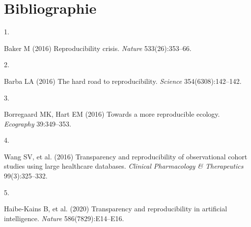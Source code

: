 \documentclass[9pt,twocolumn,twoside,]{pnas-new}
\newlength{\cslhangindent}
\newlength{\csllabelwidth}
\newlength{\cslentryspacingunit} %
\newenvironment{CSLReferences}[2] %
 {%
  \setlength{\parindent}{0pt}
  \ifodd #1
  \let\oldpar\par
  \def\par{\hangindent=\cslhangindent\oldpar}
  \fi
  \setlength{\parskip}{#2\cslentryspacingunit}
 }%
 {}
\newcommand{\CSLLeftMargin}[1]{\parbox[t]{\csllabelwidth}{#1}}
\newcommand{\CSLRightInline}[1]{\parbox[t]{\linewidth - \csllabelwidth}{#1}\break}
\begin{document}
\newpage

\hypertarget{bibliographie}{%
\section*{Bibliographie}\label{bibliographie}}

\hypertarget{refs}{}
\begin{CSLReferences}{0}{0}
\leavevmode{}%
\CSLLeftMargin{1. }
\CSLRightInline{Baker M (2016) Reproducibility crisis. \emph{Nature}
533(26):353--66.}

\leavevmode{}%
\CSLLeftMargin{2. }
\CSLRightInline{Barba LA (2016) The hard road to reproducibility.
\emph{Science} 354(6308):142--142.}

\leavevmode{}%
\CSLLeftMargin{3. }
\CSLRightInline{Borregaard MK, Hart EM (2016) Towards a more
reproducible ecology. \emph{Ecography} 39:349--353.}

\leavevmode{}%
\CSLLeftMargin{4. }
\CSLRightInline{Wang SV, et al. (2016) Transparency and reproducibility
of observational cohort studies using large healthcare databases.
\emph{Clinical Pharmacology \& Therapeutics} 99(3):325--332.}

\leavevmode{}%
\CSLLeftMargin{5. }
\CSLRightInline{Haibe-Kains B, et al. (2020) Transparency and
reproducibility in artificial intelligence. \emph{Nature}
586(7829):E14--E16.}

\end{CSLReferences}



% 
\end{document}
